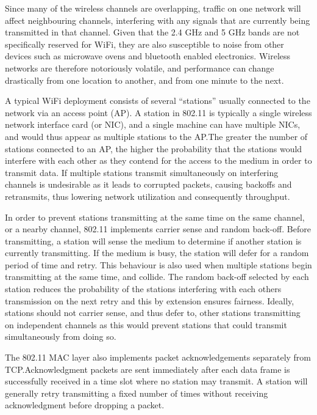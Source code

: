 Since many of the wireless channels are overlapping, traffic on one network will
affect neighbouring channels, interfering with any signals that are currently
being transmitted in that channel. Given that the 2.4 GHz and 5 GHz bands are
not specifically reserved for WiFi, they are also susceptible to noise from
other devices such as microwave ovens and bluetooth enabled electronics.
Wireless networks are therefore notoriously volatile, and performance can change
drastically from one location to another, and from one minute to the next.

A typical WiFi deployment consists of several ``stations'' usually connected to
the network via an access point (AP). A station in 802.11 is typically a single
wireless network interface card (or NIC), and a single machine can have multiple
NICs, and would thus appear as multiple stations to the AP.\@ The greater the
number of stations connected to an AP, the higher the probability that the
stations would interfere with each other as they contend for the access to the
medium in order to transmit data. If multiple stations transmit simultaneously
on interfering channels is undesirable as it leads to corrupted packets, causing
backoffs and retransmits, thus lowering network utilization and consequently
throughput.

In order to prevent stations transmitting at the same time on the same channel,
or a nearby channel, 802.11 implements carrier sense and random back-off. Before
transmitting, a station will sense the medium to determine if another station is
currently transmitting. If the medium is busy, the station will defer for a
random period of time and retry. This behaviour is also used when multiple
stations begin transmitting at the same time, and collide. The random back-off
selected by each station reduces the probability of the stations interfering
with each others transmission on the next retry and this by extension ensures
fairness. Ideally, stations should not carrier sense, and thus defer to, other
stations transmitting on independent channels as this would prevent stations
that could transmit simultaneously from doing so.

The 802.11 MAC layer also implements packet acknowledgements separately from
TCP.\@ Acknowledgment packets are sent immediately after each data frame is
successfully received in a time slot where no station may transmit. A station
will generally retry transmitting a fixed number of times without receiving
acknowledgment before dropping a packet.

